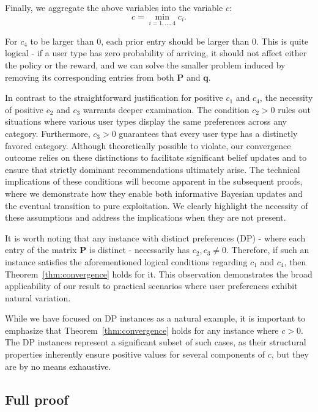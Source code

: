 Finally, we aggregate the above variables into the variable $c$:
\[
c = \min_{i=1, ..., 4} c_i.
\]

For $c_4$ to be larger than $0$, each prior entry should be larger than $0$. This is quite logical - if a user type has zero probability of arriving, it should not affect either the policy or the reward, and we can solve the smaller problem induced by removing its corresponding entries from both $\bm P$ and $\bm q$. 

In contrast to the straightforward justification for positive $c_1$ and $c_4$, the necessity of positive $c_2$ and $c_3$ warrants deeper examination. The condition $c_2 > 0$ rules out situations where various user types display the same preferences across any category. Furthermore, $c_3 > 0$ guarantees that every user type has a distinctly favored category. Although theoretically possible to violate, our convergence outcome relies on these distinctions to facilitate significant belief updates and to ensure that strictly dominant recommendations ultimately arise. The technical implications of these conditions will become apparent in the subsequent proofs, where we demonstrate how they enable both informative Bayesian updates and the eventual transition to pure exploitation. We clearly highlight the necessity of these assumptions and address the implications when they are not present.

It is worth noting that any instance with distinct preferences (DP) - where each entry of the matrix $\bm P$ is distinct - necessarily has $c_2, c_3 \neq 0$. Therefore, if such an instance satisfies the aforementioned logical conditions regarding $c_1$ and $c_4$, then Theorem~\ref{thm:convergence} holds for it. This observation demonstrates the broad applicability of our result to practical scenarios where user preferences exhibit natural variation.

While we have focused on DP instances as a natural example, it is important to emphasize that Theorem~\ref{thm:convergence} holds for any instance where $c > 0$. The DP instances represent a significant subset of such cases, as their structural properties inherently ensure positive values for several components of $c$, but they are by no means exhaustive.

\subsection{Full proof}

